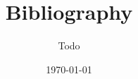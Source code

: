 \documentclass[11pt]{article}
\begin{document}
\title{Bibliography}
\author{Todo}
\date{\today}
\maketitle

\nocite{*}


{}

\end{document}
